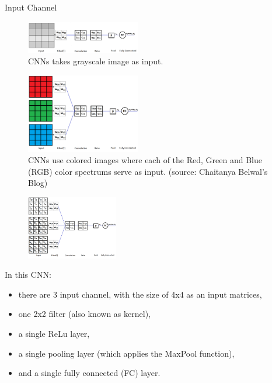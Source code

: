 \begin{vbframe}{Input Channel}
 \begin{figure}
    \centering
    \includegraphics[width=5cm]{figure/1channel.png}
    \caption{\tiny CNNs takes grayscale image as input.}
  \end{figure}


 \begin{figure}
    \centering
    \includegraphics[width=5cm]{figure/3channel.png}
    \caption{\tiny CNNs use colored images where each of the Red, Green and Blue (RGB) color spectrums serve as input. (source: Chaitanya Belwal's Blog)}
  \end{figure}

 \begin{figure}
    \centering
    \includegraphics[width=4cm]{figure/cnn-net.png}
  \end{figure}

In this CNN:
    \begin{itemize}
       \item there are 3 input channel, with the size of 4x4 as an input matrices, 
       \item one 2x2 filter (also known as kernel), 
       \item a single ReLu layer,
       \item a single pooling layer (which applies the MaxPool function),
       \item and a single fully connected (FC) layer.
    \end{itemize}


\end{vbframe}
